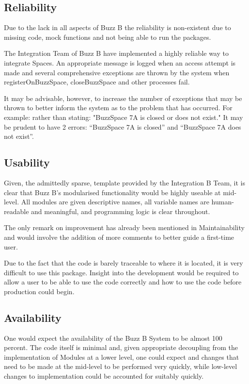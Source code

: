 \documentclass[12pt]{article}
\begin{document}
\subsection{Reliability}
Due to the lack in all aspects of Buzz B the reliability is non-existent due to missing code, mock functions and not being able to run the packages.

The Integration Team of Buzz B have implemented a highly reliable way to integrate Spaces. An appropriate message is logged when an access attempt is made and several comprehensive exceptions are thrown by the system when registerOnBuzzSpace, closeBuzzSpace and other processes fail.

It may be advisable, however, to increase the number of exceptions that may be thrown to better inform the system as to the problem that has occurred. For example: rather than stating: "BuzzSpace 7A is closed or does not exist." It may be prudent to have 2 errors: “BuzzSpace 7A is closed” and “BuzzSpace 7A does not exist”.

\subsection{Usability}
Given, the admittedly sparse, template provided by the Integration B Team, it is clear that Buzz B’s modularised functionality would be highly useable at mid-level. All modules are given descriptive names, all variable names are human-readable and meaningful, and programming logic is clear throughout. 

The only remark on improvement has already been mentioned in Maintainability and would involve the addition of more comments to better guide a first-time user.


Due to the fact that the code is barely traceable to where it is located, it is very difficult to use this package. Insight into the development would be required to allow a user to be able to use the code correctly and how to use the code before production could begin.
\subsection{Availability}
One would expect the availability of the Buzz B System to be almost 100 percent. The code itself is minimal and, given appropriate decoupling from the implementation of Modules at a lower level, one could expect and changes that need to be made at the mid-level to be performed very quickly, while low-level changes to implementation could be accounted for suitably quickly.
\end{document}
